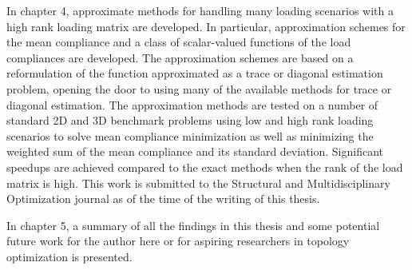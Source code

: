 In chapter 4, approximate methods for handling many loading scenarios with a high rank loading matrix are developed. In particular, approximation schemes for the mean compliance and a class of scalar-valued functions of the load compliances are developed. The approximation schemes are based on a reformulation of the function approximated as a trace or diagonal estimation problem, opening the door to using many of the available methods for trace or diagonal estimation. The approximation methods are tested on a number of standard 2D and 3D benchmark problems using low and high rank loading scenarios to solve mean compliance minimization as well as minimizing the weighted sum of the mean compliance and its standard deviation. Significant speedups are achieved compared to the exact methods when the rank of the load matrix is high. This work is submitted to the Structural and Multidisciplinary Optimization journal as of the time of the writing of this thesis. 

In chapter 5, a summary of all the findings in this thesis and some potential future work for the author here or for aspiring researchers in topology optimization is presented.

\clearpage

